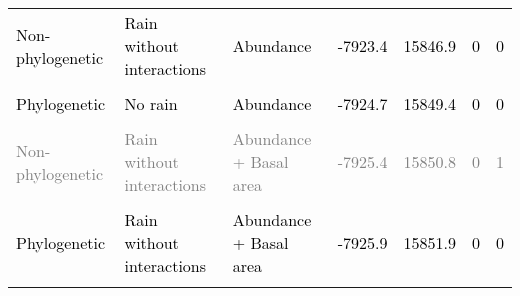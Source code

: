 \documentclass[
  12pt,
  letterpaper,
  DIV=11,
  numbers=noendperiod]{scrartcl}
\begin{document}
\begin{table}[H]
{\begin{tabular}[t]{lllllll}
\textcolor{black}{Non-phylogenetic} & \textcolor{black}{Rain without interactions} & \textcolor{black}{Abundance} & \textcolor{black}{-7923.4} & \textcolor{black}{15846.9} & \textcolor{black}{0} & \textcolor{black}{0}\\
\cellcolor{gray!6}{\textcolor{gray}{Non-phylogenetic}} & \cellcolor{gray!6}{\textcolor{gray}{No rain}} & \cellcolor{gray!6}{\textcolor{gray}{Abundance}} & \cellcolor{gray!6}{\textcolor{gray}{-7924.2}} & \cellcolor{gray!6}{\textcolor{gray}{15848.4}} & \cellcolor{gray!6}{\textcolor{gray}{0}} & \cellcolor{gray!6}{\textcolor{gray}{1}}\\
\textcolor{black}{Phylogenetic} & \textcolor{black}{No rain} & \textcolor{black}{Abundance} & \textcolor{black}{-7924.7} & \textcolor{black}{15849.4} & \textcolor{black}{0} & \textcolor{black}{0}\\
\addlinespace
\cellcolor{gray!6}{\textcolor{gray}{Non-phylogenetic}} & \cellcolor{gray!6}{\textcolor{gray}{No rain}} & \cellcolor{gray!6}{\textcolor{gray}{Basal area}} & \cellcolor{gray!6}{\textcolor{gray}{-7924.8}} & \cellcolor{gray!6}{\textcolor{gray}{15849.7}} & \cellcolor{gray!6}{\textcolor{gray}{0}} & \cellcolor{gray!6}{\textcolor{gray}{4}}\\
\textcolor{gray}{Non-phylogenetic} & \textcolor{gray}{Rain without interactions} & \textcolor{gray}{Abundance + Basal area} & \textcolor{gray}{-7925.4} & \textcolor{gray}{15850.8} & \textcolor{gray}{0} & \textcolor{gray}{1}\\
\cellcolor{gray!6}{\textcolor{gray}{Phylogenetic}} & \cellcolor{gray!6}{\textcolor{gray}{No rain}} & \cellcolor{gray!6}{\textcolor{gray}{Basal area}} & \cellcolor{gray!6}{\textcolor{gray}{-7925.5}} & \cellcolor{gray!6}{\textcolor{gray}{15851.1}} & \cellcolor{gray!6}{\textcolor{gray}{0}} & \cellcolor{gray!6}{\textcolor{gray}{1}}\\
\textcolor{black}{Phylogenetic} & \textcolor{black}{Rain without interactions} & \textcolor{black}{Abundance + Basal area} & \textcolor{black}{-7925.9} & \textcolor{black}{15851.9} & \textcolor{black}{0} & \textcolor{black}{0}\\
\cellcolor{gray!6}{\textcolor{black}{Phylogenetic}} & \cellcolor{gray!6}{\textcolor{black}{Rain without interactions}} & \cellcolor{gray!6}{\textcolor{black}{Abundance \$\textbackslash{}times\$ Basal area}} & \cellcolor{gray!6}{\textcolor{black}{-7926.3}} & \cellcolor{gray!6}{\textcolor{black}{15852.5}} & \cellcolor{gray!6}{\textcolor{black}{0}} & \cellcolor{gray!6}{\textcolor{black}{0}}\\

\end{tabular}}
\end{table}
\end{document}

